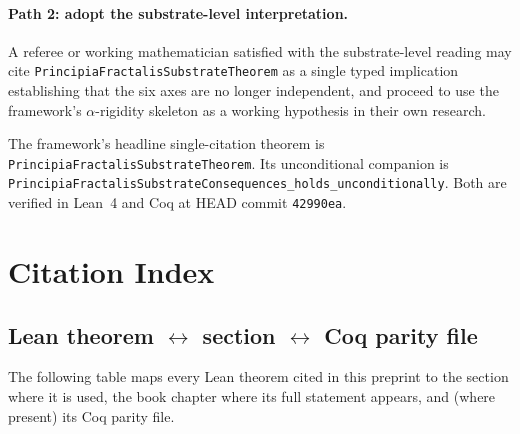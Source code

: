 \documentclass[11pt,a4paper]{article}
\theoremstyle{definition}
\theoremstyle{remark}
\newcommand{\lean}[1]{\texttt{\small #1}}
\begin{document}
\paragraph{Path 2: adopt the substrate-level interpretation.}
A referee or working mathematician satisfied with the
substrate-level reading may cite
\lean{PrincipiaFractalisSubstrateTheorem} as a single typed
implication establishing that the six axes are no longer
independent, and proceed to use the framework's
$\alpha$-rigidity skeleton as a working hypothesis in their own
research.

The framework's headline single-citation theorem is
\lean{PrincipiaFractalisSubstrateTheorem}. Its unconditional
companion is
\lean{PrincipiaFractalisSubstrateConsequences\_holds\_unconditionally}.
Both are verified in Lean~4 and Coq at HEAD commit
\texttt{42990ea}.

\section{Citation Index}
\label{sec:citation-index}

\subsection{Lean theorem $\leftrightarrow$ section $\leftrightarrow$ Coq parity file}

The following table maps every Lean theorem cited in this preprint
to the section where it is used, the book chapter where its
full statement appears, and (where present) its Coq parity file.
\end{document}
